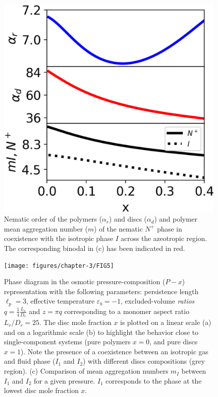 \begin{figure}
  \includegraphics[width= .6\linewidth]{figures/chapter-3/FIG4}
\caption{Nematic order of the polymers ($\alpha_{r}$) and discs ($\alpha_{d}$) and polymer mean aggregation number ($m$) of  the nematic $N^{+}$ phase in coexistence with the isotropic phase $I$  across the azeotropic region. The corresponding binodal in (c) has been indicated in red. } 
  \label{fig:azeotrope}
\end{figure}

\begin{figure}[ht]
  \texttt{[image: figures/chapter-3/FIG5]}
\caption{Phase diagram in the osmotic pressure-composition ($P-x$) representation with the following parameters: persistence length $\ell_{p} = 3$, effective temperature $\varepsilon_{b} = -1$, excluded-volume {\em ratios} $q = \frac{1}{4}\frac{L_{r}}{D_{r}}$ and $z=\pi q$ corresponding to a monomer aspect ratio $L_{r}/D_{r} =25$. The disc mole fraction $x$ is plotted on a linear scale (a) and on a logarithmic scale (b) to highlight the behavior close to single-component systems (pure polymers $x=0$, and pure discs $x=1$). Note the presence of a coexistence between an isotropic gas and fluid  phase ($I_1$ and $I_2$) with different discs compositions (grey region). (c) Comparison of mean aggregation numbers $m_{I}$ between $I_{1}$ and $I_{2}$ for a given pressure. $I_{1}$ corresponds to the phase at the lowest disc mole fraction $x$. }
  \label{fig:coexistence}
\end{figure}

